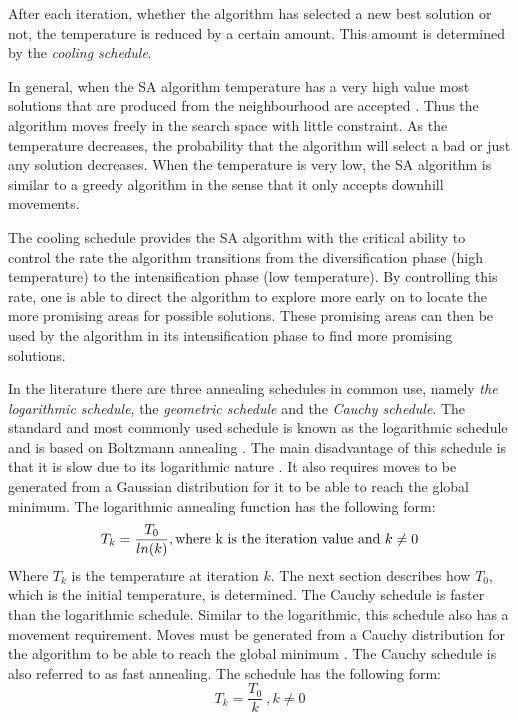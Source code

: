 After each iteration, whether the algorithm has selected a new best solution or not, the temperature is reduced by a certain amount. This amount is determined by the \emph{cooling schedule}.

In general, when the \gls{SA} algorithm temperature has a very high value most solutions that are produced from the neighbourhood are accepted \cite{ClusterSA}. Thus the algorithm moves freely in the search space with little constraint. As the temperature decreases, the probability that the algorithm will select a bad or just any solution decreases\cite{ClusterSA}. When the temperature is very low, the \gls{SA} algorithm is similar to a greedy algorithm in the sense that it only accepts downhill movements\cite{ClusterSA}.

The cooling schedule provides the \gls{SA} algorithm with the critical ability to control the rate the algorithm transitions from the diversification phase (high temperature) to the intensification phase (low temperature)\cite{ClusterSA}. By controlling this rate, one is able to direct the algorithm to explore more early on to locate the more promising areas for possible solutions. These promising areas can then be used by the algorithm in its intensification phase to find more promising solutions.

In the literature there are three annealing schedules in common use, namely \emph{the logarithmic schedule}, the \emph{geometric schedule} and the \emph{Cauchy schedule}\cite{VeryFastSAImageEnchancement,SASingleMultiObj}. 
The standard and most commonly used schedule is known as the logarithmic schedule and is based on Boltzmann annealing \cite{VeryFastSAImageEnchancement}. The main disadvantage of this schedule is that it is slow due to its logarithmic nature \cite{VeryFastSAImageEnchancement}. It also requires moves to be generated from a Gaussian distribution for it to be able to reach the global minimum\cite{SASingleMultiObj}. The logarithmic annealing function has the following form:
\begin{equation}
\label{eq:logcooling}
	T_k = \frac{T_0}{ln(k)},\text{where k is the iteration value and } k \neq 0\\
\end{equation}
Where $T_k$ is the temperature at iteration $k$. The next section describes how $T_0$, which is the initial temperature, is determined.
The Cauchy schedule is faster than the logarithmic schedule. Similar to the logarithmic, this schedule also has a movement requirement. Moves must be generated from a Cauchy distribution for the algorithm to be able to reach the global minimum \cite{SASingleMultiObj,VeryFastSAImageEnchancement}. The Cauchy schedule is also referred to as fast annealing\cite{VeryFastSAImageEnchancement}. The schedule has the following form:
\begin{equation}
\label{eq:cauchycooling}
	T_k = \frac{T_0}{k} ~, k \neq 0
\end{equation}

